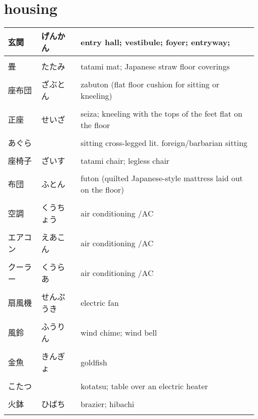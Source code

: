 \documentclass{article}
\newcommand\tabni[1][0.2cm]{\hspace*{#1}}
\begin{document}
\section{ \tabni housing}
\begin{tabular}{ l | l | p{10.5cm} }
玄関        	&げんかん   		&entry hall; vestibule; foyer; entryway;    \\ \hline \\[-1em]
畳         	&たたみ     		&tatami mat; Japanese straw floor coverings \\ \hline \\[-1em]
座布団     	&ざぶとん   		&zabuton (flat floor cushion for sitting or kneeling) \\ \hline \\[-1em]
正座    		&せいざ 			&seiza; kneeling with the tops of the feet flat on the floor\\ \hline \\[-1em]
あぐら      	&           	&sitting cross-legged {lit. foreign/barbarian sitting} \\ \hline \\[-1em]
座椅子      	&ざいす     		&tatami chair; legless chair \\ \hline \\[-1em]
布団        	&ふとん     		&futon (quilted Japanese-style mattress laid out on the floor) \\ \hline \\[-1em]
空調        	&くうちょう 			&air conditioning /AC \\ \hline \\[-1em]
エアコン    	&えあこん   		&air conditioning /AC \\ \hline \\[-1em]
クーラー    	&くうらあ   		&air conditioning /AC \\ \hline \\[-1em]
扇風機      	&せんぷうき 		&electric fan \\ \hline \\[-1em]
風鈴        	&ふうりん   		&wind chime; wind bell \\ \hline \\[-1em]
金魚        	&きんぎょ   		&goldfish \\ \hline \\[-1em]
こたつ      	&           	&kotatsu; table over an electric heater \\ \hline \\[-1em]
火鉢        	&ひばち     		&brazier; hibachi \\ \hline  \\[-1em]

\end{tabular}
\end{document}
